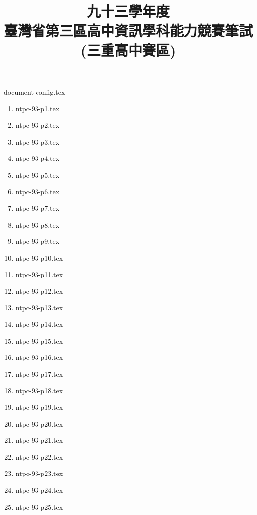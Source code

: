 \documentclass[12pt,a4paper]{report}
\begin{document}
\begin{CJK}{UTF8}{bkai}

{document-config.tex}
\title{九十三學年度\\臺灣省第三區高中資訊學科能力競賽筆試\\(三重高中賽區)}
\date{}
\maketitle

\begin{enumerate}
\item {ntpc-93-p1.tex}
\item {ntpc-93-p2.tex}
\item {ntpc-93-p3.tex}
\item {ntpc-93-p4.tex}
\item {ntpc-93-p5.tex}
\item {ntpc-93-p6.tex}
\item {ntpc-93-p7.tex}
\item {ntpc-93-p8.tex}
\item {ntpc-93-p9.tex}
\item {ntpc-93-p10.tex}
\item {ntpc-93-p11.tex}
\item {ntpc-93-p12.tex}
\item {ntpc-93-p13.tex}
\item {ntpc-93-p14.tex}
\item {ntpc-93-p15.tex}
\item {ntpc-93-p16.tex}
\item {ntpc-93-p17.tex}
\item {ntpc-93-p18.tex}
\item {ntpc-93-p19.tex}
\item {ntpc-93-p20.tex}
\item {ntpc-93-p21.tex}
\item {ntpc-93-p22.tex}
\item {ntpc-93-p23.tex}
\item {ntpc-93-p24.tex}
\item {ntpc-93-p25.tex}

\end{enumerate}
\end{CJK}
\end{document}
